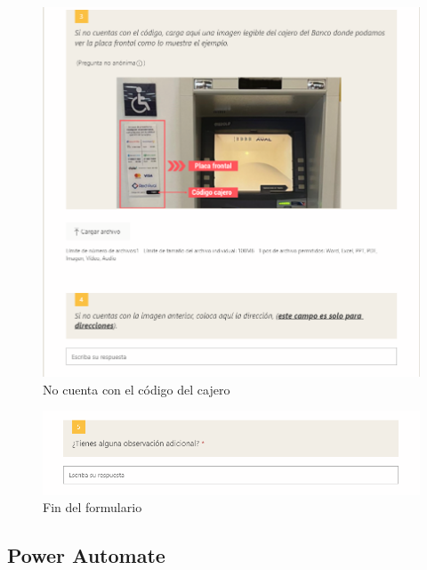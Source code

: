 \begin{figure}[H]
	\centering
	\includegraphics[scale=0.3]{Capitulo3/imagenes/f2.2.png}
	\caption{No cuenta con el código del cajero}
	\label{fig:CuentaCodigoDelCajero2}
\end{figure}
\begin{figure}[H]
	\centering
	\includegraphics[scale=0.3]{Capitulo3/imagenes/f3.png}
	\caption{Fin del formulario}
	\label{fig:FinForm}
\end{figure}

\subsection{Power Automate}
